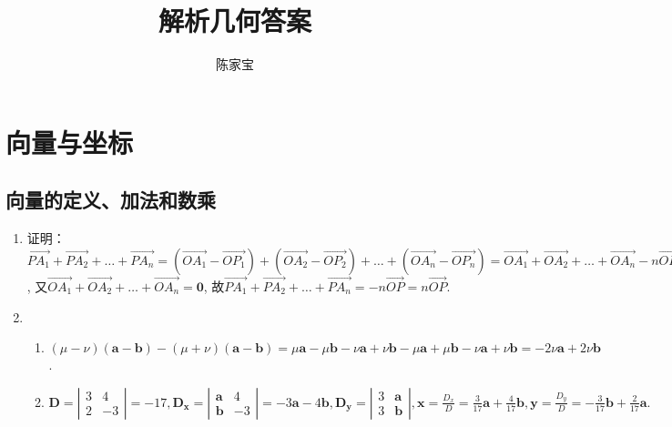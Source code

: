 \documentclass[UTF8]{ctexart}
\title{解析几何答案}
\author{陈家宝}
\date{}
\begin{document}
\maketitle
\tableofcontents
\section{向量与坐标}
\subsection{向量的定义、加法和数乘}

\begin{enumerate}
\item 证明：$\overrightarrow{PA_1}+\overrightarrow{PA_2}+ \dots +\overrightarrow{PA_n}=\left(\overrightarrow{OA_1}-\overrightarrow{OP_1}\right)+\left(\overrightarrow{OA_2}-\overrightarrow{OP_2}\right)+ \dots +\left(\overrightarrow{OA_n}-\overrightarrow{OP_n}\right)=\overrightarrow{OA_1}+\overrightarrow{OA_2}+ \dots +\overrightarrow{OA_n}-n\overrightarrow{OP}$,
又$\overrightarrow{OA_1}+\overrightarrow{OA_2}+ \dots +\overrightarrow{OA_n}=\boldsymbol{0}$,
故$\overrightarrow{PA_1}+\overrightarrow{PA_2}+ \dots +\overrightarrow{PA_n}=-n\overrightarrow{OP}=n\overrightarrow{OP}.$

\item 
\begin{enumerate}[(1)]
\item $\left(\mu - \nu\right)\left(\boldsymbol{a}-\boldsymbol{b}\right)-\left(\mu + \nu\right)\left(\boldsymbol{a}-\boldsymbol{b}\right)=\mu \boldsymbol{a}-\mu \boldsymbol{b}-\nu \boldsymbol{a}+\nu \boldsymbol{b}-\mu \boldsymbol{a}+\mu \boldsymbol{b}-\nu \boldsymbol{a}+\nu \boldsymbol{b}=-2\nu \boldsymbol{a}+2\nu \boldsymbol{b}$.
\item 
$\mathbf{D}=\left|\begin{array}{ccc}
3 & 4\\
2 & -3
\end{array} \right|
=-17,\mathbf{D_x}=\left|\begin{array}{ccc}\mathbf{a}&4\\ \mathbf{b}&-3\end{array}\right| =-3\mathbf{a}-4\mathbf{b},
\mathbf{D_y}=\left|\begin{array}{ccc} 3 & \mathbf{a}\\ 3 & \mathbf{b}\end{array}\right|,\mathbf{x}=\displaystyle\frac{D_x}{D}=\displaystyle\frac{3}{17}\mathbf{a}+\displaystyle\frac{4}{17}\mathbf{b},\mathbf{y}=\displaystyle\frac{D_y}{D}=-\displaystyle\frac{3}{17}\mathbf{b}+\displaystyle\frac{2}{17}\mathbf{a}.$
\end{enumerate}


\end{enumerate}
\end{document}
